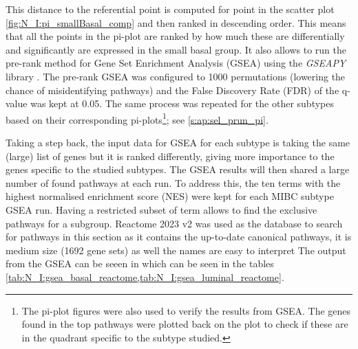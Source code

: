 This distance to the referential point is computed for point in the scatter plot \cref{fig:N_I:pi_smallBasal_comp} and then ranked in descending order. This means that all the points in the pi-plot are ranked by how much these are differentially and significantly are expressed in the small basal group. It also allows to run the pre-rank method for Gene Set Enrichment Analysis (GSEA) using the \textit{GSEAPY} library \citet{Fang2023-ec}. The pre-rank GSEA was configured to 1000 permutations (lowering the chance of misidentifying pathways) and the False Discovery Rate (FDR) of the q-value was kept at 0.05. The same process was repeated for the other subtypes based on their corresponding pi-plots\footnote{The pi-plot figures were also used to verify the results from GSEA. The genes found in the top pathways were plotted back on the plot to check if these are in the quadrant specific to the subtype studied.}; see \cref{s:ap:sel_prun_pi}.

Taking a step back, the input data for GSEA for each subtype is taking the same (large) list of genes but it is ranked differently, giving more importance to the genes specific to the studied subtypes. The GSEA results will then shared a large number of found pathways at each run. To address this, the ten terms with the highest normalised enrichment score (NES) were kept for each MIBC subtype GSEA run. Having a restricted subset of term allows to find the exclusive pathways for a subgroup. Reactome 2023 v2 was used as the database to search for pathways in this section as it contains the up-to-date canonical pathways, it is medium size (1692 gene sets) as well the names are easy to interpret The output from the GSEA can be seeen in which can be seen in the tables \cref{tab:N_I:gsea_basal_reactome,tab:N_I:gsea_luminal_reactome}.

